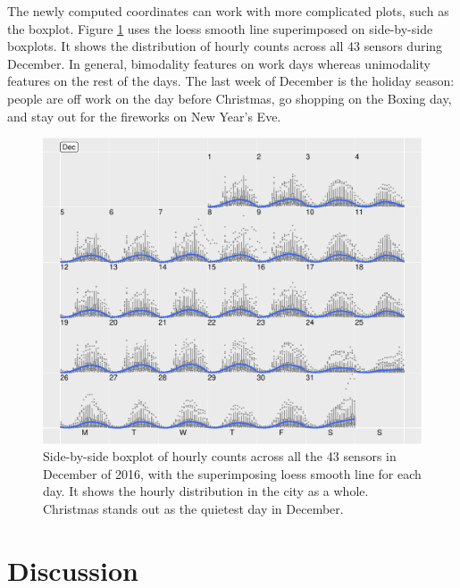 \documentclass[article]{jss}
\begin{document}
The newly computed coordinates can work with more complicated plots,
such as the boxplot. Figure \ref{fig:boxplot} uses the loess smooth line
superimposed on side-by-side boxplots. It shows the distribution of
hourly counts across all 43 sensors during December. In general,
bimodality features on work days whereas unimodality features on the
rest of the days. The last week of December is the holiday season:
people are off work on the day before Christmas, go shopping on the
Boxing day, and stay out for the fireworks on New Year's Eve.

\begin{CodeChunk}
\begin{figure}

{\centering \includegraphics[width=\textwidth]{figure/boxplot-1} 

}

\caption[Side-by-side boxplot of hourly counts across all the 43 sensors in December of 2016, with the superimposing loess smooth line for each day]{Side-by-side boxplot of hourly counts across all the 43 sensors in December of 2016, with the superimposing loess smooth line for each day. It shows the hourly distribution in the city as a whole. Christmas stands out as the quietest day in December.}\label{fig:boxplot}
\end{figure}
\end{CodeChunk}

\section{Discussion}\label{discussion}
\end{document}
